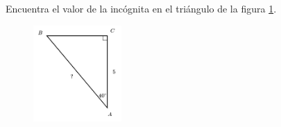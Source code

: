 \question[15]  Encuentra el valor de la incógnita en el triángulo de la figura \ref{fig:lados_functrig_19}.
\begin{figure}[H]
    \begin{center}
        \includegraphics[width=0.3\textwidth]{../images/lados_functrig_19.png}
    \end{center}
    \caption{}
    \label{fig:lados_functrig_19}
\end{figure}